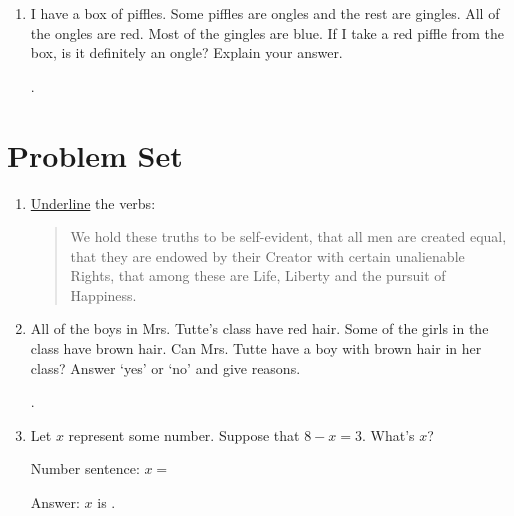 \documentclass{tufte-book}
\begin{document}
\begin{enumerate}
  \item I have a box of piffles. Some piffles are ongles and the rest are gingles.
  All of the ongles are red. Most of the gingles are blue. If I take a red piffle from the box,
  is it definitely an ongle? Explain your answer.\bigskip\par
  \dotfill\bigskip\par\dotfill\bigskip\par\dotfill.

\end{enumerate}

\clearpage\section{Problem Set }

\begin{enumerate}
  \item \underline{Underline} the verbs:
  \begin{quote}
    We hold these truths to be self-evident, that all men are created equal, that they are endowed by their Creator with certain unalienable Rights, that among these are Life, Liberty and the pursuit of Happiness.
  \end{quote}

  \item All of the boys in Mrs. Tutte's class have red hair.
  Some of the girls in the class have brown hair.
  Can Mrs. Tutte have a boy with brown hair in her class? Answer `yes' or `no' and give reasons.\bigskip\par
  \dotfill\bigskip\par\dotfill\bigskip\par\dotfill.

  \item Let $x$ represent some number. Suppose that $8 - x = 3.$
  What's $x$?\bigskip\par
  Number sentence: $x =$ \dotfill\bigskip\par
  Answer: $x$ is \dotfill.


\end{enumerate}
\end{document}

